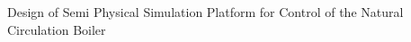 

\begin{cventries}

  \cventry
    {} %
    {Design of Semi Physical Simulation Platform for Control of the Natural Circulation Boiler} %
    {} %
    {} %
    {}


\end{cventries}

